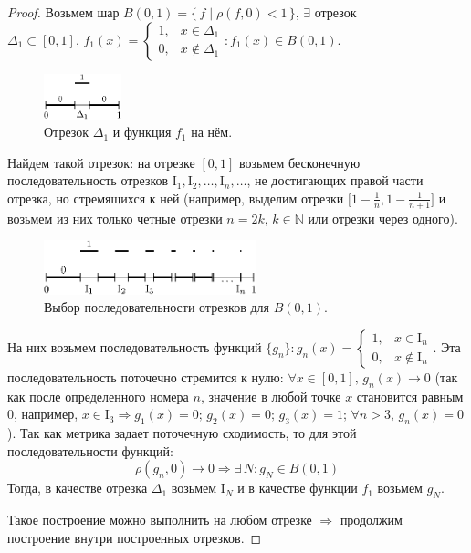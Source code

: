 \documentclass[12pt]{article}
\newcommand{\MN}{\mathbb{N}}
\newcommand{\MI}{\mathrm{I}}
\theoremstyle{definition}
\begin{document}
\begin{proof}
	Возьмем шар $B(0,1) = \{\, f \mid \rho(f,0) < 1 \,\}$, $\exists$ отрезок $\Delta_1 \subset [0,1],\, f_1(x) = \begin{cases} 1, & x \in \Delta_1\\0, & x \notin \Delta_1\end{cases} \colon f_1(x) \in B(0,1)$.
	\begin{figure}[H]
		\centering
		\includegraphics[width=0.2\textwidth]{6_1.eps}
		\caption{Отрезок $\Delta_1$ и функция $f_1$ на нём.}
		\label{6_1}
	\end{figure}
	Найдем такой отрезок: на отрезке $[0,1]$ возьмем бесконечную последовательность отрезков $\MI_1, \MI_2, \dotsc, \MI_n, \dotsc$, не достигающих правой части отрезка, но стремящихся к ней (например, выделим отрезки $\big[1 - \frac{1}{n}, 1 - \frac{1}{n+1}\big]$ и возьмем из них только четные отрезки $n = 2k, \, k \in \MN$ или отрезки через одного).
	\begin{figure}[H]
		\centering
		\includegraphics[width=0.55\textwidth]{6_2.eps}
		\caption{Выбор последовательности отрезков для $B(0,1)$.}
		\label{6_2}
	\end{figure}
	На них возьмем последовательность функций $\{g_n\} \colon g_n(x) = \begin{cases} 1, & x \in \MI_n\\0, & x \notin \MI_n\end{cases}$. Эта последовательность поточечно стремится к нулю: $\forall x \in [0,1], \, g_n(x) \to 0$ (так как после определенного номера $n$, значение в любой точке $x$ становится равным $0$, например, $x\in \MI_3 \Rightarrow g_1(x) = 0;\, g_2(x) = 0; \, g_3(x) = 1;\, \forall n > 3, \, g_n(x) = 0$). Так как метрика задает поточечную сходимость, то для этой последовательности функций: 
	$$
	\rho(g_n, 0) \to 0 \Rightarrow \exists \, N\colon g_N \in B(0,1)
	$$
	Тогда, в качестве отрезка $\Delta_1$ возьмем $\MI_N$ и в качестве функции $f_1$ возьмем $g_N$.
	
	Такое построение можно выполнить на любом отрезке $\Rightarrow$ продолжим построение внутри построенных отрезков. 
	

\end{proof}
\end{document}
